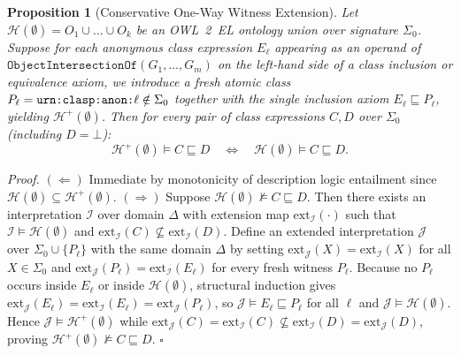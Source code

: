 \documentclass[10pt]{article}
\theoremstyle{accentthm}
\newtheorem{proposition}{Proposition}
\begin{document}
\begin{proposition}[Conservative One-Way Witness Extension]
\label{prop:witness}
Let $\mathcal{H}(\emptyset) = O_1 \cup \dots \cup O_k$ be an OWL~2~EL ontology union over signature $\Sigma_0$. Suppose for each anonymous class expression $E_\ell$ appearing as an operand of $\mathtt{ObjectIntersectionOf}(G_1,\dots,G_m)$ on the left-hand side of a class inclusion or equivalence axiom, we introduce a fresh atomic class $P_\ell = \textup{\texttt{urn:clasp:anon:}}\ell \notin \Sigma_0$ together with the single inclusion axiom $E_\ell \sqsubseteq P_\ell$, yielding $\mathcal{H}^+(\emptyset)$. Then for every pair of class expressions $C, D$ over $\Sigma_0$ (including $D = \bot$):
\[
  \mathcal{H}^+(\emptyset) \models C \sqsubseteq D \quad \Longleftrightarrow \quad \mathcal{H}(\emptyset) \models C \sqsubseteq D.
\]
\end{proposition}
\textit{Proof.} $(\Leftarrow)$ Immediate by monotonicity of description logic entailment since $\mathcal{H}(\emptyset) \subseteq \mathcal{H}^+(\emptyset)$. $(\Rightarrow)$ Suppose $\mathcal{H}(\emptyset) \not\models C \sqsubseteq D$. Then there exists an interpretation $\mathcal{I}$ over domain $\Delta$ with extension map $\mathrm{ext}_{\mathcal{I}}(\cdot)$ such that $\mathcal{I} \models \mathcal{H}(\emptyset)$ and $\mathrm{ext}_{\mathcal{I}}(C) \not\subseteq \mathrm{ext}_{\mathcal{I}}(D)$. Define an extended interpretation $\mathcal{J}$ over $\Sigma_0 \cup \{P_\ell\}$ with the same domain $\Delta$ by setting $\mathrm{ext}_{\mathcal{J}}(X) = \mathrm{ext}_{\mathcal{I}}(X)$ for all $X \in \Sigma_0$ and $\mathrm{ext}_{\mathcal{J}}(P_\ell) = \mathrm{ext}_{\mathcal{I}}(E_\ell)$ for every fresh witness $P_\ell$. Because no $P_\ell$ occurs inside $E_\ell$ or inside $\mathcal{H}(\emptyset)$, structural induction gives $\mathrm{ext}_{\mathcal{J}}(E_\ell) = \mathrm{ext}_{\mathcal{I}}(E_\ell) = \mathrm{ext}_{\mathcal{J}}(P_\ell)$, so $\mathcal{J} \models E_\ell \sqsubseteq P_\ell$ for all $\ell$ and $\mathcal{J} \models \mathcal{H}(\emptyset)$. Hence $\mathcal{J} \models \mathcal{H}^+(\emptyset)$ while $\mathrm{ext}_{\mathcal{J}}(C) = \mathrm{ext}_{\mathcal{I}}(C) \not\subseteq \mathrm{ext}_{\mathcal{I}}(D) = \mathrm{ext}_{\mathcal{J}}(D)$, proving $\mathcal{H}^+(\emptyset) \not\models C \sqsubseteq D$. \hfill $\square$
\end{document}
